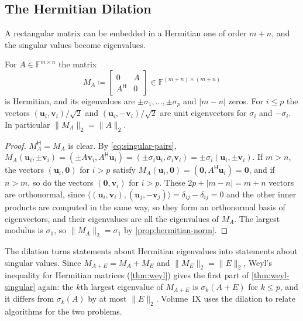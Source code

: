 \subsection{The Hermitian Dilation}

A rectangular matrix can be embedded in a Hermitian one of order $m+n$, and the singular values become eigenvalues.

\begin{proposition}
\label{prop:dilation}
For $A\in\mathbb F^{m\times n}$ the matrix
\[
M_A\coloneqq\begin{bmatrix}0&A\\A^{\mathsf H}&0\end{bmatrix}\in\mathbb F^{(m+n)\times(m+n)}
\]
is Hermitian, and its eigenvalues are $\pm\sigma_1,\ldots,\pm\sigma_p$ and $|m-n|$ zeros. For $i\le p$ the vectors $(\mathbf u_i,\mathbf v_i)/\sqrt2$ and $(\mathbf u_i,-\mathbf v_i)/\sqrt2$ are unit eigenvectors for $\sigma_i$ and $-\sigma_i$. In particular $\|M_A\|_2=\|A\|_2$.
\end{proposition}

\begin{proof}
$M_A^{\mathsf H}=M_A$ is clear. By \eqref{eq:singular-pairs}, $M_A(\mathbf u_i,\pm\mathbf v_i)=(\pm A\mathbf v_i,A^{\mathsf H}\mathbf u_i)=(\pm\sigma_i\mathbf u_i,\sigma_i\mathbf v_i)=\pm\sigma_i(\mathbf u_i,\pm\mathbf v_i)$. If $m>n$, the vectors $(\mathbf u_i,\mathbf 0)$ for $i>p$ satisfy $M_A(\mathbf u_i,\mathbf 0)=(\mathbf 0,A^{\mathsf H}\mathbf u_i)=\mathbf 0$, and if $n>m$, so do the vectors $(\mathbf 0,\mathbf v_i)$ for $i>p$. These $2p+|m-n|=m+n$ vectors are orthonormal, since $\langle(\mathbf u_i,\mathbf v_i),(\mathbf u_j,-\mathbf v_j)\rangle=\delta_{ij}-\delta_{ij}=0$ and the other inner products are computed in the same way, so they form an orthonormal basis of eigenvectors, and their eigenvalues are all the eigenvalues of $M_A$. The largest modulus is $\sigma_1$, so $\|M_A\|_2=\sigma_1$ by \cref{prop:hermitian-norm}.
\end{proof}

The dilation turns statements about Hermitian eigenvalues into statements about singular values. Since $M_{A+E}=M_A+M_E$ and $\|M_E\|_2=\|E\|_2$, Weyl's inequality for Hermitian matrices (\cref{thm:weyl}) gives the first part of \cref{thm:weyl-singular} again: the $k$th largest eigenvalue of $M_{A+E}$ is $\sigma_k(A+E)$ for $k\le p$, and it differs from $\sigma_k(A)$ by at most $\|E\|_2$. Volume~IX uses the dilation to relate algorithms for the two problems.


